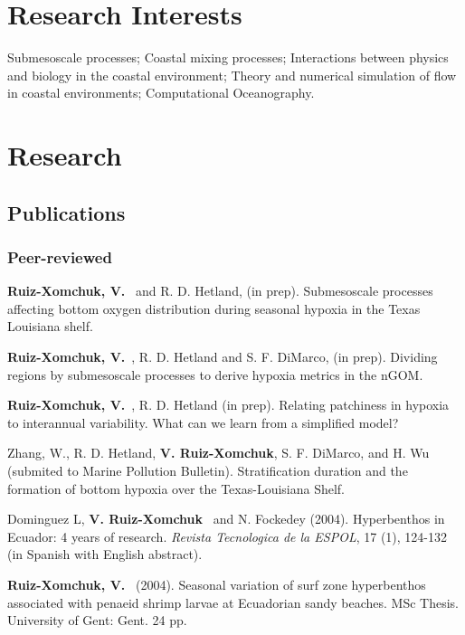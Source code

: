\documentclass[10pt,letterpaper]{article}
\newcommand{\vrx}{\textbf{V. Ruiz-Xomchuk}}
\newcommand{\rxv}{\textbf{Ruiz-Xomchuk, V.}}
\renewenvironment{itemize}{
  \begin{list}{}{
    \setlength{\leftmargin}{1.5em}
    \setlength{\itemsep}{0.25em}
    \setlength{\parskip}{0pt}
    \setlength{\parsep}{0.25em}
  }
}{
  \end{list}
}
\begin{document}
\section*{Research Interests}
\begin{itemize}
\item Submesoscale processes; Coastal mixing processes; Interactions between physics and biology in the coastal environment; Theory and numerical simulation of flow in coastal environments; Computational Oceanography.
\end{itemize}

\section*{Research}

\subsection*{Publications}

\subsubsection*{Peer-reviewed}

\begin{itemize}
\item \rxv~ and R. D. Hetland, (in prep). Submesoscale processes affecting bottom oxygen distribution during seasonal hypoxia in the Texas Louisiana shelf. 

\item \rxv~, R. D. Hetland and S. F. DiMarco, (in prep). Dividing regions by submesoscale processes to derive hypoxia metrics in the nGOM.

\item \rxv~, R. D. Hetland (in prep). Relating patchiness in hypoxia to interannual variability. What can we learn from a simplified model?

Zhang, W., R. D. Hetland, \vrx, S. F. DiMarco, and H. Wu (submited to Marine Pollution Bulletin). Stratification duration and the formation of bottom hypoxia over the Texas-Louisiana Shelf.

\item Dominguez L, \vrx~ and N. Fockedey (2004). Hyperbenthos in Ecuador: 4 years of research. \textit{Revista Tecnologica de la ESPOL}, 17 (1), 124-132 (in Spanish with English abstract). 

\item \rxv~ (2004). Seasonal variation of surf zone hyperbenthos associated with penaeid shrimp larvae at Ecuadorian sandy beaches. MSc Thesis. University of Gent: Gent. 24 pp.

\end{itemize}
\end{document}
